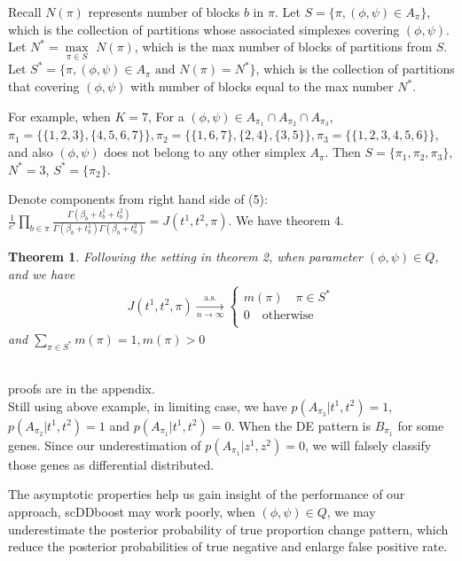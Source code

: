 \documentclass[11pt]{amsart}
\newtheorem{theorem}{Theorem}
\begin{document}
Recall $N(\pi)$ represents number of blocks $b$ in $\pi$. Let $S = \{\pi,  (\phi, \psi) \in A_\pi\}$, which is the collection of partitions whose associated simplexes covering $(\phi,\psi)$. Let $N^* = \underset{\pi\in S}\max$ $N(\pi)$, which is the max number of blocks of partitions from $S$. Let $S^* = \{\pi,  (\phi, \psi) \in A_\pi \text{ and } N(\pi) = N^*\}$, which is the collection of partitions that covering $(\phi, \psi)$ with number of blocks equal to the max number $N^*$. 

For example, when $K = 7$, For a $(\phi, \psi)\in A_{\pi_1} \cap A_{\pi_2} \cap A_{\pi_3}$, $\pi_1 = \{\{1,2,3\}, \{4,5,6,7\}\}, \pi_2 = \{\{1,6,7\}, \{2,4\},\{3,5\}\}, \pi_3 = \{\{1,2,3,4,5,6\}\}$, and also $(\phi, \psi)$ does not belong to any other simplex $A_\pi$. Then $S = \{\pi_1, \pi_2, \pi_3\}$, $N^* = 3$, $S^* = \{\pi_2\}.$ 

Denote components from right hand side of (5): $\frac{1}{c'}\underset{b\in \pi}\prod\frac{ \Gamma(\beta_b + t_b^1 + t_b^2)}{\Gamma(\beta_b + t_b^1)\Gamma(\beta_b + t_b^2)} = J(t^1,t^2,\pi).$  We have theorem 4.\\
\begin{theorem} Following the setting in theorem 2, when parameter $(\phi, \psi)\in Q$,  and we have 
\begin{eqnarray*}
    J(t^1,t^2,\pi) \xrightarrow[n\rightarrow\infty]{\text{a.s.}}\left\{
                \begin{array}{ll}
                 m(\pi) \quad  \pi \in S^* \\
                 0 \quad \text{otherwise}\\             
                \end{array}
              \right.
\end{eqnarray*}
and $\underset{\pi\in S^*}\sum m(\pi) = 1, m(\pi) > 0$\\
\end{theorem}\hfill\\
proofs are in the appendix.\\
Still using above example, in limiting case, we have $p(A_{\pi_3} | t^1, t^2) = 1$, $p(A_{\pi_2} | t^1, t^2) = 1$ and $p(A_{\pi_1}| t^1, t^2) = 0$. When the DE pattern is $B_{\pi_1}$ for some genes. Since our underestimation of $p(A_{\pi_1}| z^1, z^2) = 0$, we will falsely classify those genes as differential distributed.

The asymptotic properties help us gain insight of the performance of our approach,
scDDboost may work poorly, when $(\phi, \psi)\in Q$, we may underestimate the posterior probability of true proportion change pattern, which reduce the posterior probabilities of true negative and enlarge false positive rate.\\
\end{document}
